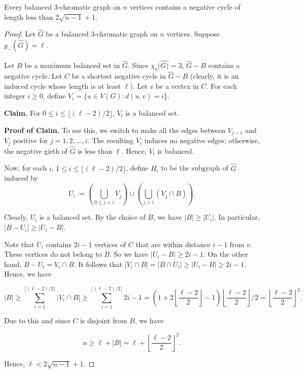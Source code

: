 \documentclass[10pt,a4paper]{amsart}
\begin{document}
\begin{theorem}\label{thm:balanced3XGraphs}
    Every balanced $3$-chromatic graph on $n$ vertices contains a negative cycle of length less than $2\sqrt{n-1}+1$.
\end{theorem}

\begin{proof}
    Let $\widehat{G}$ be a balanced $3$-chromatic graph on $n$ vertices. Suppose $g_-(\widehat{G})=\ell$.

    Let $B$ be a maximum balanced set in $\widehat{G}$. Since $\chi_b(\widehat{G)}=3$, $\widehat{G}-B$ contains a negative cycle. Let $C$ be a shortest negative cycle in $\widehat{G}-B$ (clearly, it is an induced cycle whose length is at least $\ell$). Let $v$ be a vertex in $C$. For each integer $i\geq 0$, define $V_i=\{u\in V(G): d(u,v)=i\}$.

    \textbf{Claim.} For $0\leq i\leq \lfloor(\ell-2)/2\rfloor$, $V_i$ is a balanced set.

    \textbf{Proof of Claim.} To see this, we switch to make all the edges between $V_{j-1}$ and $V_j$ positive for $j=1,2,\ldots, i$. The resulting $V_i$ induces no negative edges; otherwise, the negative girth of $\widehat{G}$ is less than $\ell$. Hence, $V_i$ is balanced.

    Now, for each $i$, $1\leq i\leq \lfloor(\ell-2)/2\rfloor$, define $H_i$ to be the subgraph of $\widehat{G}$ induced by 
    $$U_i:=\left(\bigcup_{0\leq j<i}V_j\right)\cup \left(\bigcup_{j>i}(V_j\cap B)\right).$$

    Clearly, $U_i$ is a balanced set. By the choice of $B$, we have $|B|\geq |U_i|$. In particular, $|B-U_i|\geq |U_i-B|$.

    Note that $U_i$ contains $2i-1$ vertices of $C$ that are within distance $i-1$ from $v$. These vertices do not belong to $B$. So we have $|U_i-B|\geq 2i-1$. On the other hand, $B-U_i=V_i\cap B$. It follows that $|V_i\cap B|=|B\cap U_i|\geq |U_i-B|\geq 2i-1$. Hence, we have

    $$|B|\geq \sum_{i=1}^{\lfloor(\ell-2)/2\rfloor} |V_i\cap B|\geq \sum_{i=1}^{\lfloor(\ell-2)/2\rfloor} 2i-1= \left(1+2\left\lfloor\frac{\ell-2}{2}\right\rfloor-1\right)\left\lfloor\frac{\ell-2}{2}\right\rfloor/2=\left\lfloor\frac{\ell-2}{2}\right\rfloor^2.$$

    Due to this and since $C$ is disjoint from $B$, we have

    $$n\geq \ell+|B|=\ell+\left\lfloor\frac{\ell-2}{2}\right\rfloor^2.$$

    Hence, $\ell<2\sqrt{n-1}+1$.
\end{proof}
\end{document}
